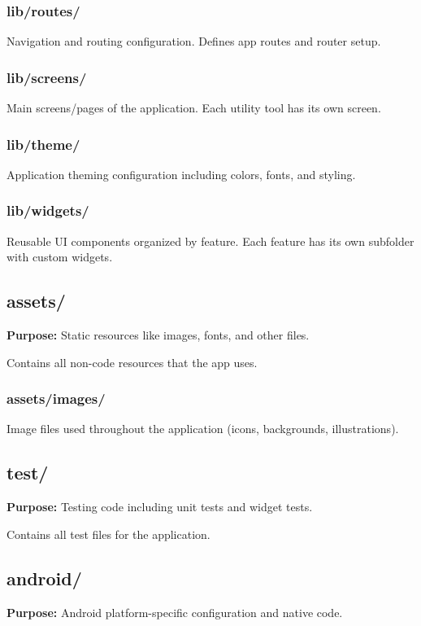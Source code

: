 \documentclass[12pt,a4paper]{article}
\begin{document}
\subsubsection{lib/routes/}
Navigation and routing configuration. Defines app routes and router setup.

\subsubsection{lib/screens/}
Main screens/pages of the application. Each utility tool has its own screen.

\subsubsection{lib/theme/}
Application theming configuration including colors, fonts, and styling.

\subsubsection{lib/widgets/}
Reusable UI components organized by feature. Each feature has its own subfolder with custom widgets.

\subsection{assets/}
\textbf{Purpose:} Static resources like images, fonts, and other files.

Contains all non-code resources that the app uses.

\subsubsection{assets/images/}
Image files used throughout the application (icons, backgrounds, illustrations).

\subsection{test/}
\textbf{Purpose:} Testing code including unit tests and widget tests.

Contains all test files for the application.

\subsection{android/}
\textbf{Purpose:} Android platform-specific configuration and native code.
\end{document}
